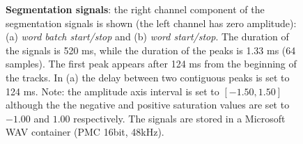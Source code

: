 \begin{figure}
	\centering
	
	
	\caption[Segmentation signals]{\textbf{Segmentation signals}:
	the right channel component of the segmentation signals is shown (the left 
	channel has zero amplitude):
	(a) \emph{word batch start/stop} and (b) \emph{word start/stop}.
	The duration of the signals is 520 ms, while the duration of
	the peaks is 1.33 ms (64 samples). The first peak appears after 124 ms from
	the beginning of the tracks.
	In (a) the delay between two contiguous peaks is set to 124 ms. 
	Note: the amplitude axis interval is set to $[-1.50, 1.50]$ although the
	the negative and positive saturation values are set to $-1.00$ and $1.00$
	respectively.
	The signals are stored in a Microsoft WAV container (PMC 16bit, 48kHz).
	}
	\label{fig:linguometer:architecture:sig:segmentation}
\end{figure}
